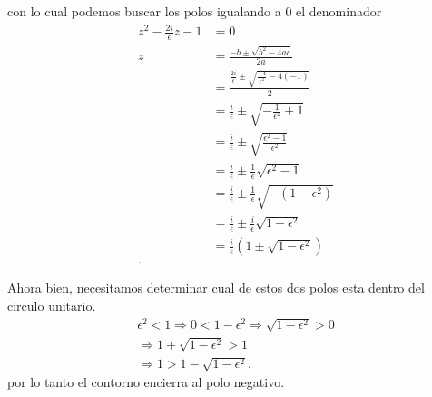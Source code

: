 \documentclass{report}
\begin{document}
  con lo cual podemos buscar los polos igualando a 0 el denominador
  \begin{align*}
    z^2-\frac{2i}{\epsilon}z-1 &= 0 \\
    z &= \frac{-b\pm\sqrt{b^2-4ac} }{2a} \\
    &= \frac{\frac{2i}{\epsilon}\pm\sqrt{\frac{-4}{\epsilon^2}-4\left( -1 \right) } }{2} \\
    &= \frac{i}{\epsilon}\pm\sqrt{-\frac{1}{\epsilon^2}+1}  \\
    &= \frac{i}{\epsilon}\pm\sqrt{\frac{\epsilon^2-1}{\epsilon^2}}  \\
    &= \frac{i}{\epsilon}\pm \frac{1}{\epsilon}\sqrt{\epsilon^{2}-1} \\
    &= \frac{i}{\epsilon}\pm \frac{1}{\epsilon}\sqrt{-\left( 1-\epsilon^2 \right) }  \\
    &= \frac{i}{\epsilon}\pm \frac{i}{\epsilon}\sqrt{1-\epsilon^2} \\
    &= \frac{i}{\epsilon}\left( 1 \pm\sqrt{1-\epsilon^2}  \right)  \\
  .\end{align*}

  Ahora bien, necesitamos determinar cual de estos dos polos esta dentro del circulo unitario.
  \begin{align*}
    \epsilon^2<1 \Rightarrow 0<1-\epsilon^2 \Rightarrow \sqrt{1-\epsilon^2} > 0\\
    \Rightarrow 1+\sqrt{1-\epsilon^2} > 1\\
    \Rightarrow 1 > 1 - \sqrt{1-\epsilon^2} 
  .\end{align*}
  por lo tanto el contorno encierra al polo negativo.
 
\end{document}
